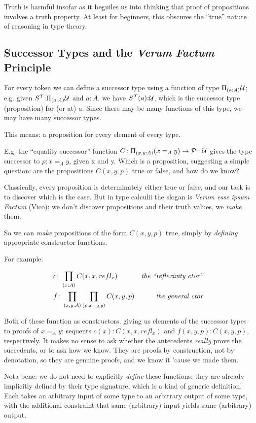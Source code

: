 \documentclass{article}
\begin{document}
Truth is harmful insofar as it beguiles us into thinking that proof of
propositions involves a truth property.  At least for beginners, this
obscures the ``true'' nature of reasoning in type theory.


\subsection{Successor Types and the \textit{Verum Factum} Principle}

For every token we can define a successor type using a function of
type \(\Pi_{(a:A)}\mathcal{U}\); e.g. given
\(S^{\mathcal{T}}{:}\Pi_{(a:A)}\mathcal{U}\) and \(a{:}A\), we have
\(S^{\mathcal{T}}(a){:}\mathcal{U}\), which is the successor type
(proposition) for (or at) \(a\).  Since there may be many functions of
this type, we may have many successor types.

This means: a proposition for every element of every type.

E.g. the ``equality successor'' function \(C\colon\Pi_{(x,y:A)}(x=_Ay)\to\mathcal{P:U}\) gives the type
successor to \(p{:}x=_Ay\), given x and y.  Which is a proposition,
suggesting a simple question: are the propositions \(C(x,y,p)\) true
or false, and how do we know?

Classically, every proposition is determinately either true or false,
and our task is to discover which is the case.  But in type calculii
the slogan is \emph{Verum esse ipsum Factum} (Vico): we don't discover
propositions and their truth values, we \emph{make} them.

So we can \emph{make} propositions of the form \(C(x,y,p)\) true,
simply by \emph{defining} appropriate constructor functions.

For example:

\begin{align}
  &c\colon\prod\limits_{(x:A)}C(x,x,refl_x) & \textit{the ``reflexivity ctor''} \\
  &f\colon\prod\limits_{(x,y:A)}\prod\limits_{(p:x=_Ay)}C(x,y,p) & \textit{the general ctor}
\end{align}

Both of these function as constructors, giving us elements of the
successor types to proofs of \(x=_Ay\): sequents
\(c(x){:}C(x,x,refl_x)\) and \(f(x,y,p){:}C(x,y,p)\),
respectively.  It makes no sense to ask whether the antecedents
\emph{really} prove the succedents, or to ask how we know.  They are
proofs by construction, not by denotation, so they are genuine proofs,
and we know it 'cause we made them.

Nota bene: we do not need to explicitly \emph{define} these functions;
they are already implicitly defined by their type signature, which is
a kind of generic definition.  Each takes an arbitrary input of some
type to an arbitrary output of some type, with the additional
constraint that same (arbitrary) input yields same (arbitrary) output.
\end{document}
